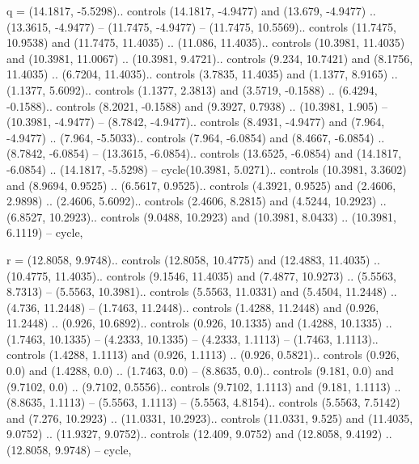 q = {(14.1817, -5.5298).. controls (14.1817, -4.9477) and (13.679, -4.9477) .. (13.3615, -4.9477) -- (11.7475, -4.9477) -- (11.7475, 10.5569).. controls (11.7475, 10.9538) and (11.7475, 11.4035) .. (11.086, 11.4035).. controls (10.3981, 11.4035) and (10.3981, 11.0067) .. (10.3981, 9.4721).. controls (9.234, 10.7421) and (8.1756, 11.4035) .. (6.7204, 11.4035).. controls (3.7835, 11.4035) and (1.1377, 8.9165) .. (1.1377, 5.6092).. controls (1.1377, 2.3813) and (3.5719, -0.1588) .. (6.4294, -0.1588).. controls (8.2021, -0.1588) and (9.3927, 0.7938) .. (10.3981, 1.905) -- (10.3981, -4.9477) -- (8.7842, -4.9477).. controls (8.4931, -4.9477) and (7.964, -4.9477) .. (7.964, -5.5033).. controls (7.964, -6.0854) and (8.4667, -6.0854) .. (8.7842, -6.0854) -- (13.3615, -6.0854).. controls (13.6525, -6.0854) and (14.1817, -6.0854) .. (14.1817, -5.5298) -- cycle(10.3981, 5.0271).. controls (10.3981, 3.3602) and (8.9694, 0.9525) .. (6.5617, 0.9525).. controls (4.3921, 0.9525) and (2.4606, 2.9898) .. (2.4606, 5.6092).. controls (2.4606, 8.2815) and (4.5244, 10.2923) .. (6.8527, 10.2923).. controls (9.0488, 10.2923) and (10.3981, 8.0433) .. (10.3981, 6.1119) -- cycle},

r = {(12.8058, 9.9748).. controls (12.8058, 10.4775) and (12.4883, 11.4035) .. (10.4775, 11.4035).. controls (9.1546, 11.4035) and (7.4877, 10.9273) .. (5.5563, 8.7313) -- (5.5563, 10.3981).. controls (5.5563, 11.0331) and (5.4504, 11.2448) .. (4.736, 11.2448) -- (1.7463, 11.2448).. controls (1.4288, 11.2448) and (0.926, 11.2448) .. (0.926, 10.6892).. controls (0.926, 10.1335) and (1.4288, 10.1335) .. (1.7463, 10.1335) -- (4.2333, 10.1335) -- (4.2333, 1.1113) -- (1.7463, 1.1113).. controls (1.4288, 1.1113) and (0.926, 1.1113) .. (0.926, 0.5821).. controls (0.926, 0.0) and (1.4288, 0.0) .. (1.7463, 0.0) -- (8.8635, 0.0).. controls (9.181, 0.0) and (9.7102, 0.0) .. (9.7102, 0.5556).. controls (9.7102, 1.1113) and (9.181, 1.1113) .. (8.8635, 1.1113) -- (5.5563, 1.1113) -- (5.5563, 4.8154).. controls (5.5563, 7.5142) and (7.276, 10.2923) .. (11.0331, 10.2923).. controls (11.0331, 9.525) and (11.4035, 9.0752) .. (11.9327, 9.0752).. controls (12.409, 9.0752) and (12.8058, 9.4192) .. (12.8058, 9.9748) -- cycle},

